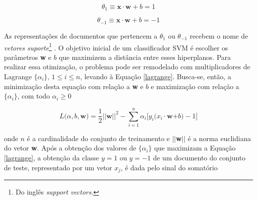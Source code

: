 \begin{equation}
\label{theta1:svm}
\ensuremath{\theta_1 \equiv } \textbf{x} \ensuremath{\cdot} \textbf{w} + \ensuremath{b} = 1
\end{equation}

\begin{equation}
\label{thetamenos1:svm}
\ensuremath{\theta_{-1} \equiv } \textbf{x} \ensuremath{\cdot} \textbf{w} + \ensuremath{b} = -1
\end{equation}

As representações de documentos que pertencem a \ensuremath{\theta_1} ou \ensuremath{\theta_{-1}} recebem o nome de \emph{vetores suporte}\footnote{Do inglês \emph{support vectors}.} \cite{mono-puc}. O objetivo inicial de um classificador SVM é escolher os parâmetros \textbf{w} e \ensuremath{b} que maximizem a distância entre esses hiperplanos. Para realizar essa otimização, o problema pode ser remodelado com multiplicadores de Lagrange \ensuremath{\{\alpha_i\}}, \ensuremath{1 \leq i \leq n}, levando à Equação \ref{lagrange}. Busca-se, então, a minimização desta equação com relação a \textbf{w} e \ensuremath{b} e maximização com relação a \ensuremath{\{\alpha_i\}}, com todo \ensuremath{\alpha_i \geq 0} \cite{mono-puc}







\begin{equation}
\label{lagrange}
\ensuremath{L(\alpha, b,}\textbf{w}\ensuremath{) = \frac{1}{2} ||}\textbf{w}\ensuremath{||^2 - \sum_{i = 1}^n \alpha_i\big[y_i(x_i \cdot}\textbf{w}\ensuremath{+ b) -1 \big]} %
\end{equation}

onde \ensuremath{n} é a cardinalidade do conjunto de treinamento e \ensuremath{||}\textbf{w}\ensuremath{||} é a norma euclidiana do vetor \textbf{w}. Após a obtenção dos valores de \ensuremath{\{\alpha_i\}} que maximizam a Equação \ref{lagrange}, a obtenção da classe \ensuremath{y = 1} ou \ensuremath{y = -1} de um documento do conjunto de teste, representado por um vetor \ensuremath{x_j}, é dada pelo sinal do somatório \cite{mono-puc}

